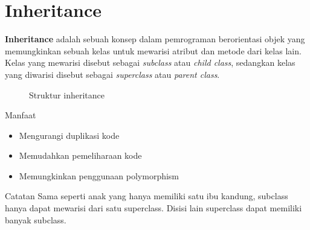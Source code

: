 \documentclass{../praktikum-ppt}
\begin{document}
    \section{Inheritance}
    \begin{frame}{\insertsection}
        \begin{definisi}
            \textbf{Inheritance} adalah sebuah konsep dalam pemrograman berorientasi objek yang memungkinkan sebuah kelas untuk mewarisi atribut dan metode dari kelas lain. Kelas yang mewarisi disebut sebagai \textit{subclass} atau \textit{child class}, sedangkan kelas yang diwarisi disebut sebagai \textit{superclass} atau \textit{parent class}. 
        \end{definisi}
        \begin{figure}[h!]
          \centering
          \caption{Struktur inheritance}       
        \end{figure}
    \end{frame}

    \begin{frame}{\insertsection}
        \begin{block}{Manfaat}
            \begin{itemize}
                \item Mengurangi duplikasi kode
                \item Memudahkan pemeliharaan kode
                \item Memungkinkan penggunaan polymorphism
            \end{itemize}
        \end{block}
        \begin{alertblock}{Catatan}
          Sama seperti anak yang hanya memiliki satu ibu kandung, subclass hanya dapat mewarisi dari satu superclass. Disisi lain superclass dapat memiliki banyak subclass.
        \end{alertblock}
    \end{frame}
\end{document}
